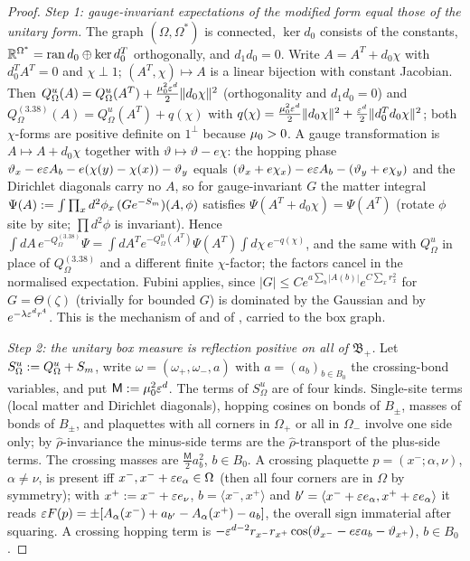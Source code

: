 \begin{proof}
\emph{Step 1: gauge-invariant expectations of the modified form equal those of the unitary form.} The graph $(\Omega,\Omega^*)$ is connected, $\ker d_0$ consists of the constants, $\mathbb R^{\Omega^*}=\operatorname{ran}d_0\oplus\ker d_0^T$ orthogonally, and $d_1d_0=0$. Write $A=A^T+d_0\chi$ with $d_0^TA^T=0$ and $\chi\perp1$; $(A^T,\chi)\mapsto A$ is a linear bijection with constant Jacobian. Then $Q^u_\Omega(A)=Q^u_\Omega(A^T)+\frac{\mu_0^2\varepsilon^d}2\|d_0\chi\|^2$ (orthogonality and $d_1d_0=0$) and $Q^{(3.38)}_\Omega(A)=Q^u_\Omega(A^T)+q(\chi)$ with $q(\chi)=\frac{\mu_0^2\varepsilon^d}2\|d_0\chi\|^2+\frac{\varepsilon^d}2\|d_0^Td_0\chi\|^2$; both $\chi$-forms are positive definite on $1^\perp$ because $\mu_0>0$. A gauge transformation is $A\mapsto A+d_0\chi$ together with $\vartheta\mapsto\vartheta-e\chi$: the hopping phase $\vartheta_x-e\varepsilon A_b-e(\chi(y)-\chi(x))-\vartheta_y$ equals $(\vartheta_x+e\chi_x)-e\varepsilon A_b-(\vartheta_y+e\chi_y)$ and the Dirichlet diagonals carry no $A$, so for gauge-invariant $G$ the matter integral $\Psi(A):=\int\prod_xd^2\phi_x\,(Ge^{-S_m})(A,\phi)$ satisfies $\Psi(A^T+d_0\chi)=\Psi(A^T)$ (rotate $\phi$ site by site; $\prod d^2\phi$ is invariant). Hence $\int dA\,e^{-Q^{(3.38)}_\Omega}\Psi=\int dA^Te^{-Q^u_\Omega(A^T)}\Psi(A^T)\int d\chi\,e^{-q(\chi)}$, and the same with $Q^u_\Omega$ in place of $Q^{(3.38)}_\Omega$ and a different finite $\chi$-factor; the factors cancel in the normalised expectation. Fubini applies, since $|G|\le Ce^{a\sum_b|A(b)|}e^{C\sum_xr_x^2}$ for $G=\Theta(\zeta)$ (trivially for bounded $G$) is dominated by the Gaussian and by $e^{-\lambda\varepsilon^d r^4}$. This is the mechanism of \cite[Thm.~5.1]{BFS1} and of \cite[Lemma~7.7]{SymPhase}, carried to the box graph.

\emph{Step 2: the unitary box measure is reflection positive on all of $\mathfrak B_+$.} Let $S^u_\Omega:= Q^u_\Omega+S_m$, write $\omega=(\omega_+,\omega_-,a)$ with $a=(a_b)_{b\in B_0}$ the crossing-bond variables, and put $\mathsf M:=\mu_0^2\varepsilon^d$. The terms of $S^u_\Omega$ are of four kinds. Single-site terms (local matter and Dirichlet diagonals), hopping cosines on bonds of $B_\pm$, masses of bonds of $B_\pm$, and plaquettes with all corners in $\Omega_+$ or all in $\Omega_-$ involve one side only; by $\hat\rho$-invariance the minus-side terms are the $\hat\rho$-transport of the plus-side terms. The crossing masses are $\frac{\mathsf M}2a_b^2$, $b\in B_0$. A crossing plaquette $p=(x^-;\alpha,\nu)$, $\alpha\ne\nu$, is present iff $x^-,x^-+\varepsilon e_\alpha\in\Omega$ (then all four corners are in $\Omega$ by symmetry); with $x^+:= x^-+\varepsilon e_\nu$, $b=\langle x^-,x^+\rangle$ and $b'=\langle x^-+\varepsilon e_\alpha,x^++\varepsilon e_\alpha\rangle$ it reads $\varepsilon F(p)=\pm[A_\alpha(x^-)+a_{b'}-A_\alpha(x^+)-a_b]$, the overall sign immaterial after squaring. A crossing hopping term is $-\varepsilon^{d-2}r_{x^-}r_{x^+}\cos(\vartheta_{x^-}-e\varepsilon a_b-\vartheta_{x^+})$, $b\in B_0$.


\end{proof}
